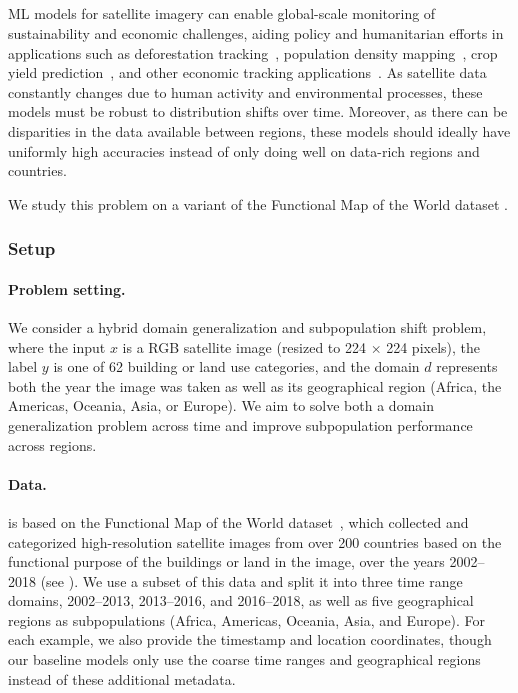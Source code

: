 \subsection{\FMoW}\label{sec:app_fmow}

ML models for satellite imagery can enable global-scale monitoring of sustainability and economic challenges, aiding policy and humanitarian efforts in applications such as deforestation tracking~\citep{hansen2013forest}, population density mapping~\citep{tiecke2017population}, crop yield prediction~\citep{wang2020weakly}, and other economic tracking applications~\citep{katona2018parking}.
As satellite data constantly changes due to human activity and environmental processes, these models must be robust to distribution shifts over time.
Moreover, as there can be disparities in the data available between regions,
these models should ideally have uniformly high accuracies instead of only doing well on data-rich regions and countries.

We study this problem on a variant of the Functional Map of the World dataset \citep{christie2018fmow}.

\subsubsection{Setup}

\paragraph{Problem setting.}
We consider a hybrid domain generalization and subpopulation shift problem, where the input $x$ is a RGB satellite image (resized to 224 $\times$ 224 pixels), the label $y$ is one of 62 building or land use categories, and the domain $d$ represents both the year the image was taken as well as its geographical region (Africa, the Americas, Oceania, Asia, or Europe).
We aim to solve both a domain generalization problem across time and improve subpopulation performance across regions.

\paragraph{Data.}
\FMoW is based on the Functional Map of the World dataset~\citep{christie2018fmow}, which collected and categorized high-resolution satellite images from over 200 countries based on the functional purpose of the buildings or land in the image, over the years 2002--2018 (see ).
We use a subset of this data and split it into three time range domains, 2002--2013, 2013--2016, and 2016--2018, as well as five geographical regions as subpopulations (Africa, Americas, Oceania, Asia, and Europe).
For each example, we also provide the timestamp and location coordinates, though our baseline models only use the coarse time ranges and geographical regions instead of these additional metadata.

